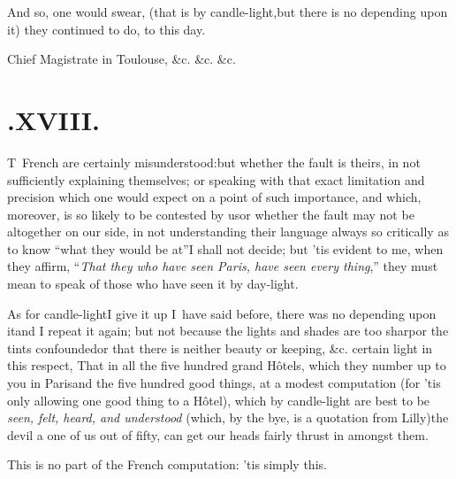 \documentclass{article}
\begin{document}
\tsk And so, one would swear, (that is by candle-light,\tsk but there is no depending
upon it) they continued to do, to this day.

\bgroup\footnotesize\indent\fnast\enspace
Chief Magistrate in Toulouse, \&c. \&c. \&c.\par\egroup

\vfill{}\eject
\section{.\enspace XVIII.}

\lettrine{T}{\,} French are certainly misunderstood:\tsh but whether the fault is theirs,
in not sufficiently explaining themselves; or speaking with that exact limitation
and precision which one would expect on a point of such importance, and which,
moreover, is so likely to be contested by us\tsh or whether the fault may not be
altogether on our side, in not understanding their language always so critically as
to know “what they would be at”\tsh I shall not decide; but ’tis evident to me, when
they affirm, “\textit{That they who have seen Paris, have seen every thing},” they
must mean to speak of those who have seen it by day-light.

As for candle-light\tsk I give it up\tsh{} I~have said
before, there was no depending upon it\tsk and I repeat it again;
but not because the lights and shades are too sharp\tsk or the
tints confounded\tsk or that there is neither beauty or keeping,
\&c.\break
{}
certain light in this respect, That in all the five
hundred grand Hôtels, which they number up to you in
Paris\tsk and the five hundred good things, at a modest
computation (for ’tis only allowing one good thing to a
Hôtel), which by candle-light are best to be \textit{seen, felt,
heard, and understood} (which, by the bye, is a quotation
from Lilly)\tsh the devil a one of us out of fifty,
can get our heads fairly thrust in amongst them.

This is no part of the French computation: ’tis
simply this.
\end{document}
